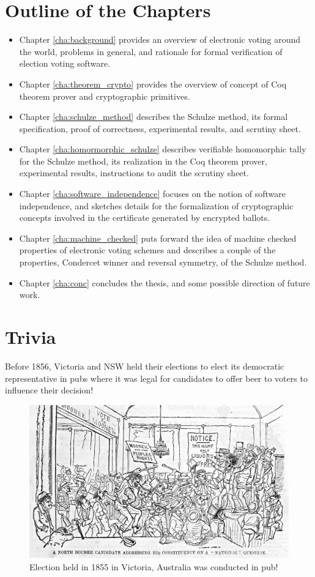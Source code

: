\section{Outline of the Chapters}
\begin{itemize}

\item Chapter \ref{cha:background} provides an overview of electronic voting around the world, 
problems in general, and rationale for formal verification of election voting software. 
\item Chapter \ref{cha:theorem_crypto} provides the overview of concept of 
Coq theorem prover  and cryptographic primitives.  
\item Chapter \ref{cha:schulze_method} 
describes the Schulze method, its formal specification, proof of correctness, experimental results, 
and scrutiny sheet.  
\item Chapter \ref{cha:homormorphic_schulze} describes 
verifiable homomorphic tally for the Schulze method, its realization in the Coq theorem prover, experimental 
results,  instructions to audit the scrutiny sheet. 
\item Chapter \ref{cha:software_independence} focuses on the notion of software independence, and 
sketches details for the formalization of  cryptographic concepts involved in the 
certificate generated by encrypted ballots. 
\item Chapter \ref{cha:machine_checked} puts forward the idea of 
machine checked properties of electronic voting schemes and describes a couple of the 
properties,  Condercet winner and reversal symmetry, of the Schulze method. 
\item Chapter \ref{cha:conc} concludes the thesis, and some possible direction of future work. 
\end{itemize}


\section{Trivia}
 Before 1856, Victoria and NSW held their elections to elect its 
	  democratic representative in pubs where it was legal for 
	  candidates to offer beer to voters to influence their 
	  decision! 
	  
	   \begin{figure}[htb]
	\begin{center}
	\includegraphics[scale=0.25]{NorthBourke.jpg}
	\caption{Election held in 1855 in Victoria, Australia 
	  was conducted in pub!}
	\end{center}
  \end{figure}   
  
